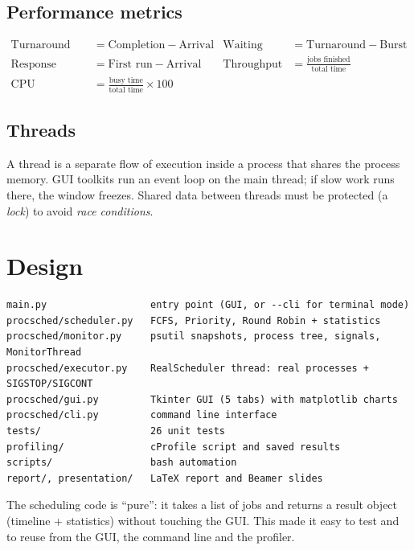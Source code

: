 \documentclass[11pt,a4paper]{article}
\begin{document}
\subsection{Performance metrics}
\begin{align*}
\text{Turnaround} &= \text{Completion} - \text{Arrival} &
\text{Waiting} &= \text{Turnaround} - \text{Burst}\\
\text{Response} &= \text{First run} - \text{Arrival} &
\text{Throughput} &= \frac{\text{jobs finished}}{\text{total time}}\\
\text{CPU utilisation} &= \frac{\text{busy time}}{\text{total time}}\times 100
\end{align*}

\subsection{Threads}
A thread is a separate flow of execution inside a process that shares the process memory.
GUI toolkits run an event loop on the main thread; if slow work runs there, the window
freezes. Shared data between threads must be protected (a \emph{lock}) to avoid
\emph{race conditions}.

\section{Design}

\begin{lstlisting}[caption={Project layout}]
main.py                  entry point (GUI, or --cli for terminal mode)
procsched/scheduler.py   FCFS, Priority, Round Robin + statistics
procsched/monitor.py     psutil snapshots, process tree, signals, MonitorThread
procsched/executor.py    RealScheduler thread: real processes + SIGSTOP/SIGCONT
procsched/gui.py         Tkinter GUI (5 tabs) with matplotlib charts
procsched/cli.py         command line interface
tests/                   26 unit tests
profiling/               cProfile script and saved results
scripts/                 bash automation
report/, presentation/   LaTeX report and Beamer slides
\end{lstlisting}

The scheduling code is ``pure'': it takes a list of jobs and returns a result object
(timeline + statistics) without touching the GUI. This made it easy to test and to reuse
from the GUI, the command line and the profiler.
\end{document}
